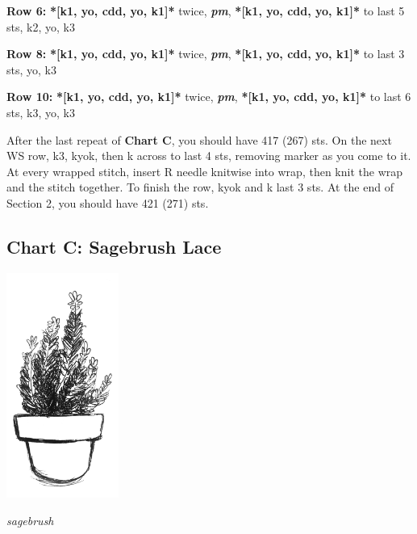 \documentclass[12pt]{article}
\newcommand{\vocab}[1]{\emph{\textbf{#1}}} %
\newcommand{\rowDir}[1]{\textbf{#1:}} %
\renewcommand{\repeat}[1]{\textbf{*[#1]*}} %
\renewcommand{\pm}{\vocab{pm}} %
\newenvironment{unframed}
    {%
	\setlength{\parindent}{-2em}
	\begin{addmargin}[2em]{0pt}}
    {\end{addmargin}
	\setlength{\parindent}{0em}}
\begin{document}
\begin{multicols}{2}
\begin{unframed}
\rowDir{Row 6}  \repeat{k1, yo, cdd, yo, k1} twice, \pm, \repeat{k1, yo, cdd, yo, k1} to last 5 sts, k2, yo, k3

\rowDir{Row 8}  \repeat{k1, yo, cdd, yo, k1} twice, \pm, \repeat{k1, yo, cdd, yo, k1} to last 3 sts, yo, k3

\rowDir{Row 10}  \repeat{k1, yo, cdd, yo, k1} twice, \pm, \repeat{k1, yo, cdd, yo, k1} to last 6 sts, k3, yo, k3
\end{unframed}

After the last repeat of \textbf{Chart C}, you should have 417 (267) sts. On the next WS row, k3, kyok, then k across to last 4 sts, removing marker as you come to it. At every wrapped stitch, insert R needle knitwise into wrap, then knit the wrap and the stitch together. To finish the row, kyok and k last 3 sts. At the end of Section 2, you should have 421 (271) sts.
\end{multicols}

\subsection*{Chart C: Sagebrush Lace}
 
\vspace{-2.6in}\hspace{5.2in}\includegraphics[height=2.9in]{2_sagebrush.jpg}

\vspace{-.6em}
\hspace{5.5in} \emph{sagebrush}
\end{document}
